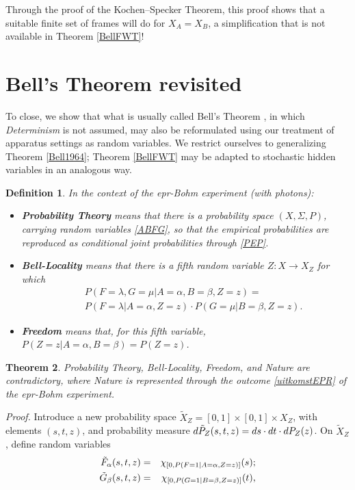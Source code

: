 \documentclass[12pt]{article}
\newtheorem{Definition}{Definition}[section]
\newtheorem{Theorem}[Definition]{Theorem}
\newcommand{\epr}{{\sc epr}}
\newcommand{\raw}{\rightarrow} \newcommand{\rat}{\mapsto}
\newcommand{\x}{\times} \newcommand{\hb}{\hbar}
\newcommand{\er}{\eqref}
\newcommand{\al}{\alpha} \newcommand{\bt}{L\beta}
\newcommand{\lm}{\lambda} \newcommand{\Lm}{\Lambda}
\newcommand{\Sg}{\Sigma} \newcommand{\ta}{\tau} \newcommand{\ph}{\phi}
\begin{document}
\noindent Through the proof of the Kochen--Specker Theorem, this proof  shows that a suitable finite set of frames will do for $X_A=X_B$, a simplification that is not available in Theorem \ref{BellFWT}!
\section{Bell's  Theorem revisited} \label{BLTsec}
To close, we show that what is usually called Bell's Theorem \cite{Bell4,Bub,JB,Gill,Jaeger,Maudlin,Seevinck,WW}, in which \emph{Determinism} is not assumed, may also be reformulated using our  treatment of  apparatus settings as random variables.
We restrict ourselves to generalizing Theorem \ref{Bell1964};  Theorem \ref{BellFWT} may be adapted to stochastic hidden variables in an  analogous way.
\begin{Definition}\label{Bellnewdefs}
In the context of the  \epr-Bohm experiment (with photons):
\begin{itemize}
\item
\textbf{Probability Theory} means that there is a probability space $(X,\Sg,P)$, carrying random variables 
\er{ABFG}, so that the empirical  probabilities are reproduced as conditional joint probabilities through \er{PEP}.
\item \textbf{Bell-Locality}  means that there is a fifth random variable $Z:X\raw X_Z$ for which
\begin{eqnarray} && P(F=\lm,G=\mu|A=\al,B=\beta,Z=z)=  \\
&& P(F=\lm|A=\al,Z=z)\cdot P(G=\mu|B=\beta,Z=z).\label{BellL}
\end{eqnarray}
\item \textbf{Freedom} means that, for this fifth variable, $P(Z=z|A=\al,B=\beta)=P(Z=z)$.
\end{itemize}
\end{Definition}
\begin{Theorem}\label{Bell1976}
 Probability Theory,  Bell-Locality, Freedom, and Nature are contradictory, where Nature  is represented through the outcome \er{uitkomstEPR} of the \epr-Bohm experiment.
\end{Theorem}
\emph{Proof.} Introduce a new probability space $\tilde{X}_Z=[0,1]\x [0,1]\x X_Z$, with elements  $(s,t,z)$, and  probability measure $d\tilde{P}_Z(s,t,z)=ds\cdot dt\cdot dP_Z(z)$. On $\tilde{X}_Z$, define random variables
\begin{eqnarray}
\til{F}_{\al}(s,t,z)&=& \chi_{[0,P(F=1|A=\al,Z=z)]}(s);\\
\til{G}_{\beta}(s,t,z)&=& \chi_{[0,P(G=1|B=\beta,Z=z)]}(t),
\end{eqnarray}
\end{document}

